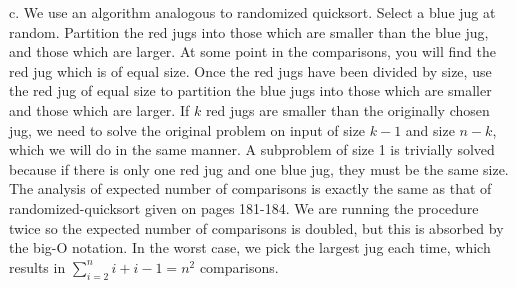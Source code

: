 \documentclass{article}
\begin{document}
c. We use an algorithm analogous to randomized quicksort. Select a blue jug at random. Partition the red jugs into those which are smaller than the blue jug, and those which are larger. At some point in the comparisons, you will find the red jug which is of equal size.  Once the red jugs have been divided by size, use the red jug of equal size to partition the blue jugs into those which are smaller and those which are larger.  If $k$ red jugs are smaller than the originally chosen jug, we need to solve the original problem on input of size $k-1$ and size $n-k$, which we will do in the same manner. A subproblem of size 1 is trivially solved because if there is only one red jug and one blue jug, they must be the same size. The analysis of expected number of comparisons is exactly the same as that of randomized-quicksort given on pages 181-184.  We are running the procedure twice so the expected number of comparisons is doubled, but this is absorbed by the big-O notation. In the worst case, we pick the largest jug each time, which results in $\sum_{i=2}^{n} i + i - 1 =n^2$ comparisons. \\
\end{document}

